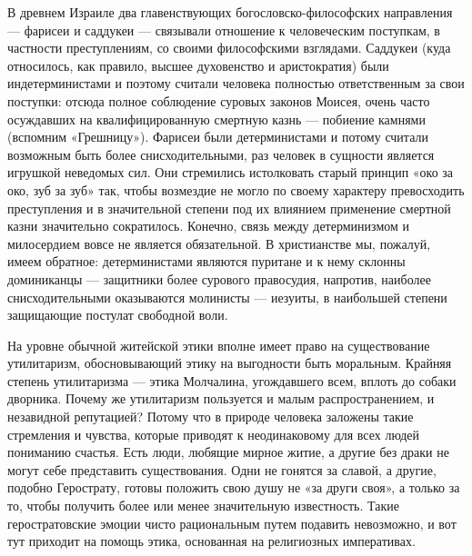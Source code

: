 В древнем Израиле два главенствующих богословско-философских направления ---
фарисеи и саддукеи --- связывали отношение к человеческим поступкам, в частности
преступлениям, со своими философскими взглядами. Саддукеи (куда относилось, как
правило, высшее духовенство и аристократия) были индетерминистами и поэтому
считали человека полностью ответственным за свои поступки: отсюда полное
соблюдение суровых законов Моисея, очень часто осуждавших на квалифицированную
смертную казнь --- побиение камнями (вспомним «Грешницу»). Фарисеи были
детерминистами и потому считали возможным быть более снисходительными, раз
человек в сущности является игрушкой неведомых сил. Они стремились истолковать
старый принцип «око за око, зуб за зуб» так, чтобы возмездие не могло по своему
характеру превосходить преступления и в значительной степени под их влиянием
применение смертной казни значительно сократилось. Конечно, связь между
детерминизмом и милосердием вовсе не является обязательной. В христианстве мы,
пожалуй, имеем обратное: детерминистами являются пуритане и к нему склонны
доминиканцы --- защитники более сурового правосудия, напротив, наиболее
снисходительными оказываются молинисты --- иезуиты, в наибольшей степени
защищающие постулат свободной воли.

На уровне обычной житейской этики вполне имеет право на существование
утилитаризм, обосновывающий этику на выгодности быть моральным. Крайняя степень
утилитаризма --- этика Молчалина, угождавшего всем, вплоть до собаки дворника.
Почему же утилитаризм пользуется и малым распространением, и незавидной
репутацией? Потому что в природе человека заложены такие стремления и чувства,
которые приводят к неодинаковому для всех людей пониманию счастья. Есть люди,
любящие мирное житие, а другие без драки не могут себе представить
существования. Одни не гонятся за славой, а другие, подобно Герострату, готовы
положить свою душу не «за други своя», а только за то, чтобы получить более или
менее значительную известность. Такие геростратовские эмоции чисто рациональным
путем подавить невозможно, и вот тут приходит на помощь этика, основанная на
религиозных императивах.

